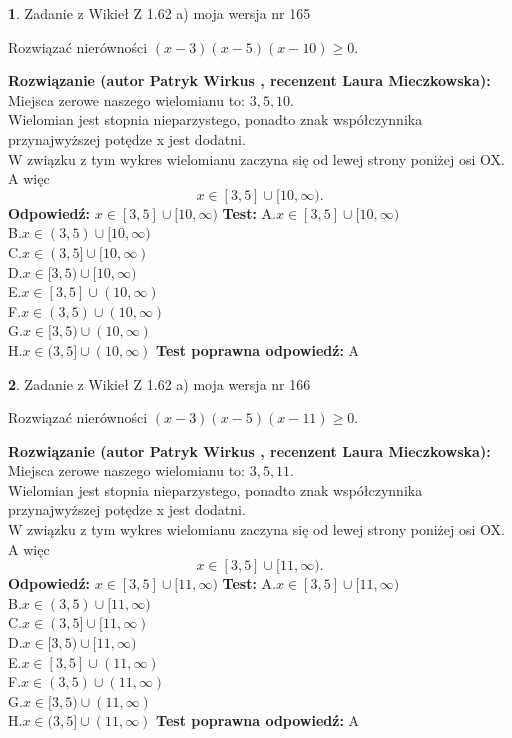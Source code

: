 \documentclass[12pt, a4paper]{article}
\theoremstyle{definition} %
\newtheorem{zad}{}
\newcommand{\zadStart}[1]{\begin{zad}#1\newline}
\newcommand{\zadStop}{\end{zad}}
\newcommand{\rozwStart}[2]{\noindent \textbf{Rozwiązanie (autor #1 , recenzent #2): }\newline}
\newcommand{\rozwStop}{\newline}
\newcommand{\odpStart}{\noindent \textbf{Odpowiedź:}\newline}
\newcommand{\odpStop}{\newline}
\newcommand{\testStart}{\noindent \textbf{Test:}\newline}
\newcommand{\testStop}{\newline}
\newcommand{\kluczStart}{\noindent \textbf{Test poprawna odpowiedź:}\newline}
\newcommand{\kluczStop}{\newline}
\begin{document}
\zadStart{Zadanie z Wikieł Z 1.62 a) moja wersja nr 165}

Rozwiązać nierówności $(x-3)(x-5)(x-10)\ge0$.
\zadStop
\rozwStart{Patryk Wirkus}{Laura Mieczkowska}
Miejsca zerowe naszego wielomianu to: $3, 5, 10$.\\
Wielomian jest stopnia nieparzystego, ponadto znak współczynnika przy\linebreak najwyższej potędze x jest dodatni.\\ W związku z tym wykres wielomianu zaczyna się od lewej strony poniżej osi OX. A więc $$x \in [3,5] \cup [10,\infty).$$
\rozwStop
\odpStart
$x \in [3,5] \cup [10,\infty)$
\odpStop
\testStart
A.$x \in [3,5] \cup [10,\infty)$\\
B.$x \in (3,5) \cup [10,\infty)$\\
C.$x \in (3,5] \cup [10,\infty)$\\
D.$x \in [3,5) \cup [10,\infty)$\\
E.$x \in [3,5] \cup (10,\infty)$\\
F.$x \in (3,5) \cup (10,\infty)$\\
G.$x \in [3,5) \cup (10,\infty)$\\
H.$x \in (3,5] \cup (10,\infty)$
\testStop
\kluczStart
A
\kluczStop



\zadStart{Zadanie z Wikieł Z 1.62 a) moja wersja nr 166}

Rozwiązać nierówności $(x-3)(x-5)(x-11)\ge0$.
\zadStop
\rozwStart{Patryk Wirkus}{Laura Mieczkowska}
Miejsca zerowe naszego wielomianu to: $3, 5, 11$.\\
Wielomian jest stopnia nieparzystego, ponadto znak współczynnika przy\linebreak najwyższej potędze x jest dodatni.\\ W związku z tym wykres wielomianu zaczyna się od lewej strony poniżej osi OX. A więc $$x \in [3,5] \cup [11,\infty).$$
\rozwStop
\odpStart
$x \in [3,5] \cup [11,\infty)$
\odpStop
\testStart
A.$x \in [3,5] \cup [11,\infty)$\\
B.$x \in (3,5) \cup [11,\infty)$\\
C.$x \in (3,5] \cup [11,\infty)$\\
D.$x \in [3,5) \cup [11,\infty)$\\
E.$x \in [3,5] \cup (11,\infty)$\\
F.$x \in (3,5) \cup (11,\infty)$\\
G.$x \in [3,5) \cup (11,\infty)$\\
H.$x \in (3,5] \cup (11,\infty)$
\testStop
\kluczStart
A
\kluczStop
\end{document}
